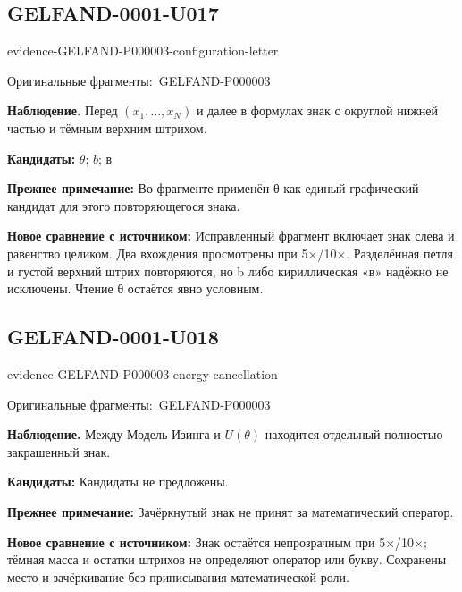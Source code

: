 \documentclass[11pt]{article}
\newcommand{\EvidenceBlock}[4]{%
 \par\smallskip\noindent\begin{minipage}{\linewidth}
 \begin{minipage}[t]{.47\linewidth}\vspace{0pt}\centering
 \csname evidence-#1-#2\endcsname\par
 {\scriptsize\SourceCropCaption\ #1}\par
 \end{minipage}\hfill
 \begin{minipage}[t]{.49\linewidth}\vspace{0pt}\raggedright
 {\small\color{orange!65!black}\textbf{#4} #3}\par
 \end{minipage}
 \end{minipage}\par\smallskip}
\newcommand{\SourceCropCaption}{Оригинальные фрагменты:}\newcommand{\ReadingCaption}{Сомнительное чтение.}\newcommand{\IncompleteCaption}{Неразобранный фрагмент.}\newcommand{\DiagramCaption}{Рисунок и набранное описание.}
\begin{document}
\subsection*{GELFAND-0001-U017}
\EvidenceBlock{GELFAND-P000003}{configuration-letter}{Перед \((x_1,\ldots,x_N)\) и далее в формулах знак с округлой нижней частью и тёмным верхним штрихом.}{Наблюдение.}
\par\smallskip\noindent\textbf{Кандидаты: } \(\theta\); \(b\); в\par
\par\smallskip\noindent\textbf{Прежнее примечание: } Во фрагменте применён θ как единый графический кандидат для этого повторяющегося знака.\par
\par\smallskip\noindent\textbf{Новое сравнение с источником: } Исправленный фрагмент включает знак слева и равенство целиком. Два вхождения просмотрены при 5×/10×. Разделённая петля и густой верхний штрих повторяются, но b либо кириллическая «в» надёжно не исключены. Чтение θ остаётся явно условным.\par

\subsection*{GELFAND-0001-U018}
\EvidenceBlock{GELFAND-P000003}{energy-cancellation}{Между Модель Изинга и \(U(\theta)\) находится отдельный полностью закрашенный знак.}{Наблюдение.}
\par\smallskip\noindent\textbf{Кандидаты: } Кандидаты не предложены.\par
\par\smallskip\noindent\textbf{Прежнее примечание: } Зачёркнутый знак не принят за математический оператор.\par
\par\smallskip\noindent\textbf{Новое сравнение с источником: } Знак остаётся непрозрачным при 5×/10×; тёмная масса и остатки штрихов не определяют оператор или букву. Сохранены место и зачёркивание без приписывания математической роли.\par
\end{document}
